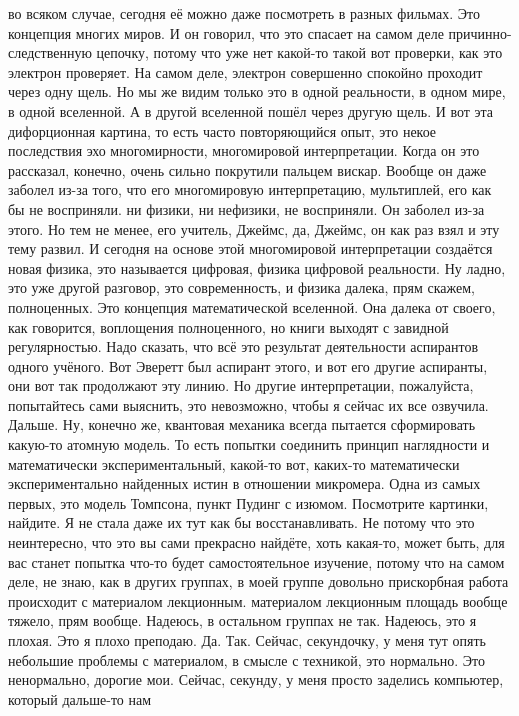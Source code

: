 во всяком случае, сегодня её можно даже посмотреть в разных фильмах. Это
концепция многих миров. И он говорил, что это спасает на самом деле причинно-
следственную цепочку, потому что уже нет какой-то такой вот проверки, как это
электрон проверяет. На самом деле, электрон совершенно спокойно проходит через
одну щель. Но мы же видим только это в одной реальности, в одном мире, в одной
вселенной. А в другой вселенной пошёл через другую щель. И вот эта дифорционная
картина, то есть часто повторяющийся опыт, это некое последствия эхо
многомирности, многомировой интерпретации. Когда он это рассказал, конечно,
очень сильно покрутили пальцем вискар. Вообще он даже заболел из-за того, что
его многомировую интерпретацию, мультиплей, его как бы не восприняли. ни физики,
ни нефизики, не восприняли. Он заболел из-за этого. Но тем не менее, его
учитель, Джеймс, да, Джеймс, он как раз взял и эту тему развил. И сегодня на
основе этой многомировой интерпретации создаётся новая физика, это называется
цифровая, физика цифровой реальности. Ну ладно, это уже другой разговор, это
современность, и физика далека, прям скажем, полноценных. Это концепция
математической вселенной. Она далека от своего, как говорится, воплощения
полноценного, но книги выходят с завидной регулярностью. Надо сказать, что всё
это результат деятельности аспирантов одного учёного. Вот Эверетт был аспирант
этого, и вот его другие аспиранты, они вот так продолжают эту линию. Но другие
интерпретации, пожалуйста, попытайтесь сами выяснить, это невозможно, чтобы я
сейчас их все озвучила. Дальше. Ну, конечно же, квантовая механика всегда
пытается сформировать какую-то атомную модель. То есть попытки соединить принцип
наглядности и математически экспериментальный, какой-то вот, каких-то
математически экспериментально найденных истин в отношении микромера. Одна из
самых первых, это модель Томпсона, пункт Пудинг с изюмом. Посмотрите картинки,
найдите. Я не стала даже их тут как бы восстанавливать. Не потому что это
неинтересно, что это вы сами прекрасно найдёте, хоть какая-то, может быть, для
вас станет попытка что-то будет самостоятельное изучение, потому что на самом
деле, не знаю, как в других группах, в моей группе довольно прискорбная работа
происходит с материалом лекционным. материалом лекционным площадь вообще тяжело,
прям вообще. Надеюсь, в остальном группах не так. Надеюсь, это я плохая. Это я
плохо преподаю. Да. Так. Сейчас, секундочку, у меня тут опять небольшие проблемы
с материалом, в смысле с техникой, это нормально. Это ненормально, дорогие мои.
Сейчас, секунду, у меня просто заделись компьютер, который дальше-то нам

